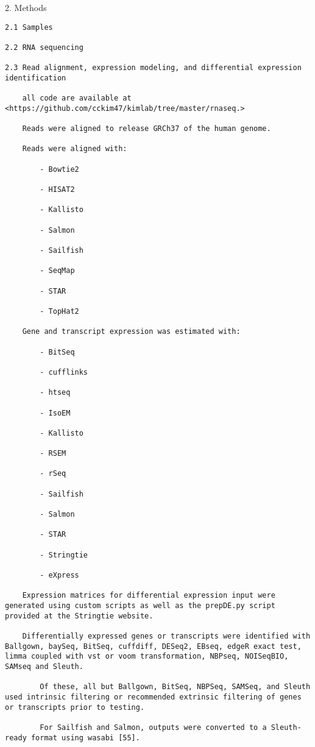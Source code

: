 \documentclass[
]{book}
\begin{document}
2. Methods

\begin{verbatim}
2.1 Samples

2.2 RNA sequencing

2.3 Read alignment, expression modeling, and differential expression identification

    all code are available at <https://github.com/cckim47/kimlab/tree/master/rnaseq.>

    Reads were aligned to release GRCh37 of the human genome.

    Reads were aligned with:

        - Bowtie2

        - HISAT2

        - Kallisto

        - Salmon

        - Sailfish

        - SeqMap

        - STAR

        - TopHat2

    Gene and transcript expression was estimated with:

        - BitSeq

        - cufflinks

        - htseq

        - IsoEM

        - Kallisto

        - RSEM

        - rSeq

        - Sailfish

        - Salmon

        - STAR

        - Stringtie

        - eXpress

    Expression matrices for differential expression input were generated using custom scripts as well as the prepDE.py script provided at the Stringtie website.

    Differentially expressed genes or transcripts were identified with Ballgown, baySeq, BitSeq, cuffdiff, DESeq2, EBseq, edgeR exact test, limma coupled with vst or voom transformation, NBPseq, NOISeqBIO, SAMseq and Sleuth.

        Of these, all but Ballgown, BitSeq, NBPSeq, SAMSeq, and Sleuth used intrinsic filtering or recommended extrinsic filtering of genes or transcripts prior to testing.

        For Sailfish and Salmon, outputs were converted to a Sleuth-ready format using wasabi [55].


\end{verbatim}
\end{document}
